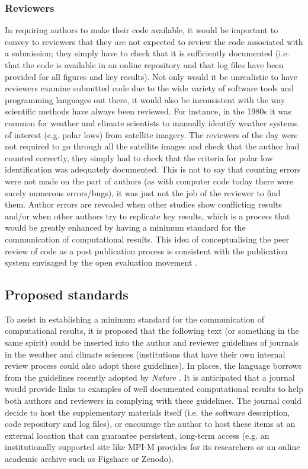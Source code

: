 \subsubsection{Reviewers}

In requiring authors to make their code available, it would be important to convey to reviewers that they are not expected to review the code associated with a submission; they simply have to check that it is sufficiently documented (i.e. that the code is available in an online repository and that log files have been provided for all figures and key results). Not only would it be unrealistic to have reviewers examine submitted code due to the wide variety of software tools and programming languages out there, it would also be inconsistent with the way scientific methods have always been reviewed. For instance, in the 1980s it was common for weather and climate scientists to manually identify weather systems of interest (e.g. polar lows) from satellite imagery. The reviewers of the day were not required to go through all the satellite images and check that the author had counted correctly, they simply had to check that the criteria for polar low identification was adequately documented. This is not to say that counting errors were not made on the part of authors (as with computer code today there were surely numerous errors/bugs), it was just not the job of the reviewer to find them. Author errors are revealed when other studies show conflicting results and/or when other authors try to replicate key results, which is a process that would be greatly enhanced by having a minimum standard for the communication of computational results. This idea of conceptualising the peer review of code as a post publication process is consistent with the publication system envisaged by the open evaluation movement \citep[e.g.][]{Kriegeskorte2012}. 
  
\subsection{Proposed standards}

To assist in establishing a minimum standard for the communication of computational results, it is proposed that the following text (or something in the same spirit) could be inserted into the author and reviewer guidelines of journals in the weather and climate sciences (institutions that have their own internal review process could also adopt these guidelines). In places, the language borrows from the guidelines recently adopted by \textit{Nature} \citep{Nature2014}. It is anticipated that a journal would provide links to examples of well documented computational results to help both authors and reviewers in complying with these guidelines. The journal could decide to host the supplementary materials itself (i.e. the software description, code repository and log files), or encourage the author to host these items at an external location that can guarantee persistent, long-term access (e.g. an institutionally supported site like MPI-M provides for its researchers or an online academic archive such as Figshare or Zenodo).

